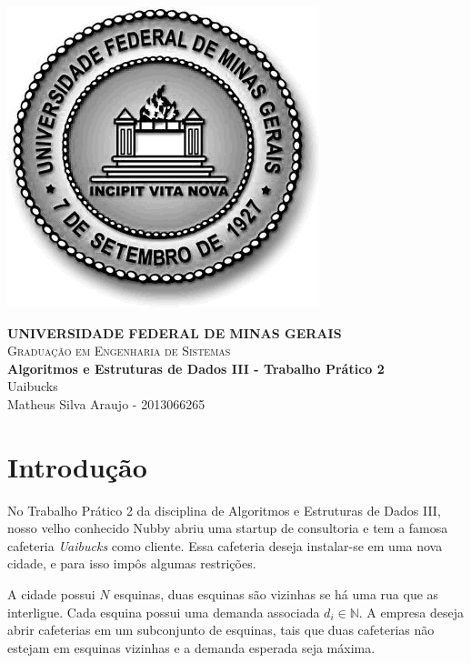 \documentclass[10pt,a4paper]{article}
\begin{document}

	\begin{minipage}[b]{0.05\linewidth}
		\includegraphics[scale=0.3]{ufmg}
	\end{minipage}
	\hfill
	\begin{minipage}[b]{0.95\linewidth}
		\begin{flushright}
			\textbf{UNIVERSIDADE FEDERAL DE MINAS GERAIS} \\
			\textsc{Graduação em Engenharia de Sistemas} \\
			\textbf{Algoritmos e Estruturas de Dados III - Trabalho Prático 2} \\
			Uaibucks \\
			Matheus Silva Araujo - 2013066265
		\end{flushright}
	\end{minipage}

	\begin{center}
		\hrulefill
	\end{center}


	\section{Introdução}

	No Trabalho Prático 2 da disciplina de Algoritmos e Estruturas de Dados III, nosso velho conhecido Nubby abriu uma startup de consultoria e 
	tem a famosa cafeteria \emph{Uaibucks} como cliente. Essa cafeteria deseja instalar-se em uma nova cidade, e para isso impôs algumas restrições. 

	A cidade possui $N$ esquinas, duas esquinas são vizinhas se há uma rua que as interligue. Cada esquina possui uma demanda associada $d_i \in \mathbb{N}$.
	A empresa deseja abrir cafeterias em um subconjunto de esquinas, tais que duas cafeterias não estejam em esquinas vizinhas e a demanda esperada seja máxima.
\end{document}
